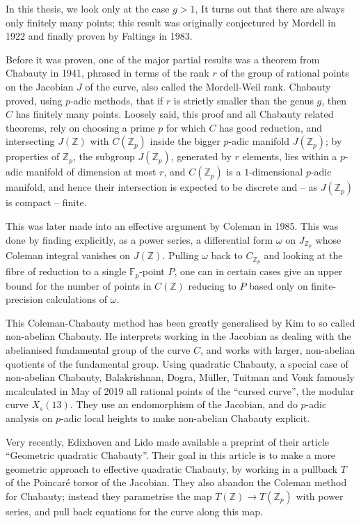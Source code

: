 \documentclass[12pt]{article}
\newcommand{\Z}{\mathbb{Z}}
\newcommand{\F}{\mathbb{F}}
\theoremstyle{plain}
\theoremstyle{definition}
\theoremstyle{remark}
\begin{document}
In this thesis, we look only at the case $g > 1$, It turns out that there are always only finitely many points; this result was originally conjectured by Mordell in 1922 and finally proven by Faltings in 1983.

Before it was proven, one of the major partial results was a theorem from Chabauty in 1941, phrased in terms of the rank $r$ of the group of rational points on the Jacobian $J$ of the curve, also called the Mordell-Weil rank. Chabauty proved, using $p$-adic methods, that if $r$ is strictly smaller than the genus $g$, then $C$ has finitely many points. Loosely said, this proof and all Chabauty related theorems, rely on choosing a prime $p$ for which $C$ has good reduction, and intersecting $J(\Z)$ with $C(\Z_p)$ inside the bigger $p$-adic manifold $J(\Z_p)$; by properties of $\Z_p$, the subgroup $J(\Z_p)$, generated by $r$ elements, lies within a $p$-adic manifold of dimension at most $r$, and $C(\Z_p)$ is a $1$-dimensional $p$-adic manifold, and hence their intersection is expected to be discrete and -- as $J(\Z_p)$ is compact -- finite.

This was later made into an effective argument by Coleman in 1985. This was done by finding explicitly, as a power series, a differential form $\omega$ on $J_{\Z_p}$ whose Coleman integral vanishes on $J(\Z)$. Pulling $\omega$ back to $C_{\Z_p}$ and looking at the fibre of reduction to a single $\F_p$-point $P$, one can in certain cases give an upper bound for the number of points in $C(\Z)$ reducing to $P$ based only on finite-precision calculations of $\omega$.

This Coleman-Chabauty method has been greatly generalised by Kim to so called non-abelian Chabauty. He interprets working in the Jacobian as dealing with the abelianised fundamental group of the curve $C$, and works with larger, non-abelian quotients of the fundamental group. Using quadratic Chabauty, a special case of non-abelian Chabauty, Balakrishnan, Dogra, M\"uller, Tuitman and Vonk famously mcalculated in May of 2019 all rational points of the ``cursed curve'', the modular curve $X_s(13)$. They use an endomorphism of the Jacobian, and do $p$-adic analysis on $p$-adic local heights to make non-abelian Chabauty explicit. 

Very recently, Edixhoven and Lido made available a preprint of their article ``Geometric quadratic Chabauty''. Their goal in this article is to make a more geometric approach to effective quadratic Chabauty, by working in a pullback $T$ of the Poincar\'e torsor of the Jacobian. They also abandon the Coleman method for Chabauty; instead they parametrise the map $T(\Z) \to T(\Z_p)$ with power series, and pull back equations for the curve along this map. 
\end{document}
